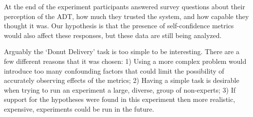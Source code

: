 At the end of the experiment participants answered survey questions about their perception of the ADT, how much they trusted the system, and how capable they thought it was. Our hypothesis is that the presence of self-confidence metrics would also affect these responses, but these data are still being analyzed.

Arguably the `Donut Delivery' task is too simple to be interesting. There are a few different reasons that it was chosen: 1) Using a more complex problem would introduce too many confounding factors that could limit the possibility of accurately observing effects of the \famsec{} metrics; 2) Having a simple task is desirable when trying to run an experiment a large, diverse, group of non-experts; 3) If support for the hypotheses were found in this experiment then more realistic, expensive, experiments could be run in the future.
